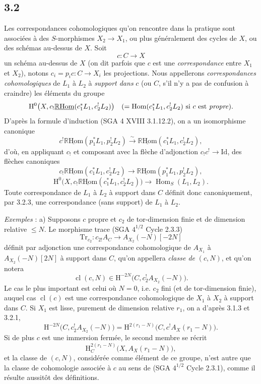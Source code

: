 \documentclass[11pt]{article}
\renewcommand{\H}{\mathrm{H}}
\DeclareMathOperator{\Hom}{Hom}
\newcommand{\R}{\mathbb{R}}\newcommand{\RHomCore}{\mathbb{R}\mathrm{Hom}}
\providecommand{\RHom}{\RHomCore}
\providecommand{\uRHom}{\underline{\RHom}}
\providecommand{\Id}{\mathrm{Id}}
\providecommand{\RHom}{\RHomCore}
\providecommand{\Hom}{\operatorname{Hom}}
\providecommand{\RHom}{\R\mathcal{H}om}
\providecommand{\R}{\mathrm R}
\providecommand{\RHom}{\RHomCore}
\providecommand{\Hom}{\operatorname{Hom}}
\begin{document}
\subsection*{3.2}
Les correspondances cohomologiques qu'on rencontre dans la pratique sont associées à des $S$-morphismes $X_2\to X_1$, ou plus généralement des cycles de $X$, ou des schémas au-dessus de $X$. Soit
\[
c:C\longrightarrow X
\]
un schéma au-dessus de $X$ (on dit parfois que $c$ est une \emph{correspondance} entre $X_1$ et $X_2$), notons $c_i=p_ic:C\to X_i$ les projections. Nous appellerons \emph{correspondances cohomologiques} de $L_1$ à $L_2$ à \emph{support dans} $c$ (ou $C$, s'il n'y a pas de confusion à craindre) les éléments du groupe
\[
\H^0\bigl(X,c_!\uRHom(c_1^*L_1,c_2^!L_2)\bigr)
\quad(=\Hom(c_1^*L_1,c_2^!L_2)\text{ si }c\text{ est \emph{propre}}).
\]
D'après la formule d'induction (SGA 4 XVIII 3.1.12.2), on a un isomorphisme canonique
\begin{equation}
c^!\uRHom(p_1^*L_1,p_2^!L_2)
\xrightarrow{\sim}
\uRHom(c_1^*L_1,c_2^!L_2),
\tag{3.2.1}
\end{equation}
d'où, en appliquant $c_!$ et composant avec la flèche d'adjonction $c_!c^!\to \Id$, des flèches canoniques
\begin{equation}
c_!\uRHom(c_1^*L_1,c_2^!L_2)
\longrightarrow
\uRHom(p_1^*L_1,p_2^!L_2),
\tag{3.2.2}
\end{equation}
\begin{equation}
\H^0\bigl(X,c_!\uRHom(c_1^*L_1,c_2^!L_2)\bigr)
\longrightarrow
\Hom_S(L_1,L_2).
\tag{3.2.3}
\end{equation}
Toute correspondance de $L_1$ à $L_2$ à support dans $C$ définit donc canoniquement, par 3.2.3, une correspondance (sans support) de $L_1$ à $L_2$.

\emph{Exemples} : a) Supposons $c$ propre et $c_2$ de tor-dimension finie et de dimension relative $\leq N$. Le morphisme trace (SGA $4^{1/2}$ Cycle 2.3.3)
\[
\mathrm{Tr}_{c_2}:c_{2!}A_C\longrightarrow A_{X_2}(-N)[-2N]
\]
définit par adjonction une correspondance cohomologique de $A_{X_1}$ à $A_{X_2}(-N)[2N]$ 
à
support dans $C$, qu'on appellera \emph{classe de} $(c,N)$, et qu'on notera
\begin{equation}
\operatorname{cl}(c,N)\in \H^{-2N}\bigl(C,c_2^!A_{X_2}(-N)\bigr).
\tag{3.2.4}
\end{equation}
Le cas le plus important est celui où $N=0$, i.e. $c_2$ fini (et de tor-dimension finie), auquel cas $\operatorname{cl}(c)$ est une correspondance cohomologique de $X_1$ à $X_2$ à support dans $C$. Si $X_1$ est lisse, purement de dimension relative $r_1$, on a d'après 3.1.3 et 3.2.1,
\begin{equation}
\H^{-2N}\bigl(C,c_2^!A_{X_2}(-N)\bigr)
=
\H^{2(r_1-N)}\bigl(C,c^!A_X(r_1-N)\bigr).
\tag{3.2.5}
\end{equation}
Si de plus $c$ est une immersion fermée, le second membre se récrit
\[
\H^{2(r_1-N)}_C\bigl(X,A_X(r_1-N)\bigr),
\]
et la classe de $(c,N)$, considérée comme élément de ce groupe, n'est autre que la classe de cohomologie associée à $c$ au sens de (SGA $4^{1/2}$ Cycle 2.3.1), comme il résulte aussitôt des définitions.
\end{document}

